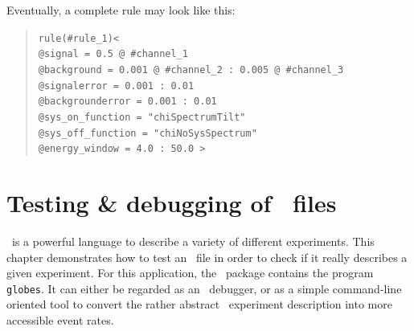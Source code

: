Eventually, a complete rule may look like this:
\begin{quote}
{\tt rule(\#rule\_1)<\\
\tb @signal = 0.5 @ \#channel\_1\\
\tb @background = 0.001 @ \#channel\_2 :  0.005 @ \#channel\_3\\
\tb @signalerror =       0.001  :       0.01\\
\tb @backgrounderror =   0.001 :       0.01\\
\tb @sys\_on\_function = "chiSpectrumTilt"  \\
\tb @sys\_off\_function = "chiNoSysSpectrum"  \\
\tb @energy\_window = 4.0 : 50.0
>}
\end{quote}

%
% 

\chapter{Testing \& debugging of \AEDL\ files}
\label{chap:exp_def}

\AEDL\ is a powerful language to describe a variety 
of different experiments.
This chapter demonstrates how to test an \AEDL\ file in order to check
if it really describes a given experiment. 
For this application, the \GLOBES\ package contains the program
{\tt globes}. It can either be 
regarded as an \AEDL\ debugger, or as a simple command-line oriented tool to convert the rather  abstract \AEDL\ experiment description into more accessible event rates.

